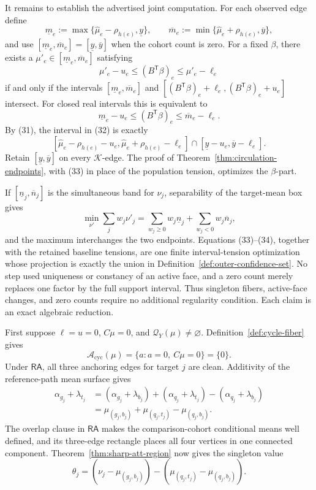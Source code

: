 It remains to establish the advertised joint computation.  For each observed edge define
\[
 \underline m_e:=\max\{\widehat\mu_e-\rho_{h(e)},\underline y\},
 \qquad
 \overline m_e:=\min\{\widehat\mu_e+\rho_{h(e)},\overline y\},
\tag{31}
\]
and use \([\underline m_e,\overline m_e]=[\underline y,\overline y]\) when the cohort count is zero.  For a fixed \(\beta\), there exists a \(\mu'_e\in[\underline m_e,\overline m_e]\) satisfying
\[
 \mu'_e-u_e\le(B^{\mathsf T}\beta)_e\le\mu'_e-\ell_e
\]
if and only if the intervals \([\underline m_e,\overline m_e]\) and \([(B^{\mathsf T}\beta)_e+\ell_e,(B^{\mathsf T}\beta)_e+u_e]\) intersect.  For closed real intervals this is equivalent to
\[
 \underline m_e-u_e\le(B^{\mathsf T}\beta)_e
 \le\overline m_e-\ell_e.
\tag{32}
\]
By (31), the interval in (32) is exactly
\[
 [\widehat\mu_e-\rho_{h(e)}-u_e,
   \widehat\mu_e+\rho_{h(e)}-\ell_e]
 \cap[\underline y-u_e,\overline y-\ell_e].
\tag{33}
\]
Retain \([\underline y,\overline y]\) on every \(\mathcal K\)-edge.  The proof of Theorem~\ref{thm:circulation-endpoints}, with (33) in place of the population tension, optimizes the \(\beta\)-part.

If \([\underline n_j,\overline n_j]\) is the simultaneous band for \(\nu_j\), separability of the target-mean box gives
\[
 \min_{\nu'}\sum_jw_j\nu'_j
 =\sum_{w_j\ge0}w_j\underline n_j
  +\sum_{w_j<0}w_j\overline n_j,
\tag{34}
\]
and the maximum interchanges the two endpoints.  Equations (33)--(34), together with the retained baseline tensions, are one finite interval-tension optimization whose projection is exactly the union in Definition~\ref{def:outer-confidence-set}.  No step used uniqueness or constancy of an active face, and a zero count merely replaces one factor by the full support interval.  Thus singleton fibers, active-face changes, and zero counts require no additional regularity condition.
Each claim is an exact algebraic reduction.

First suppose \(\ell=u=0\), \(C\mu=0\), and \(\mathcal Q_Y(\mu)\ne\varnothing\).  Definition~\ref{def:cycle-fiber} gives
\[
 \mathcal A_{\mathrm{cyc}}(\mu)
 =\{a:a=0,\ C\mu=0\}=\{0\}.
\tag{35}
\]
Under \(\mathsf{RA}\), all three anchoring edges for target \(j\) are clean.  Additivity of the reference-path mean surface gives
\[
 \begin{aligned}
 \alpha_{g_j}+\lambda_{t_j}
 &=(\alpha_{g_j}+\lambda_{b_j})
   +(\alpha_{q_j}+\lambda_{t_j})
   -(\alpha_{q_j}+\lambda_{b_j})\\
 &=\mu_{(g_j,b_j)}+\mu_{(q_j,t_j)}-\mu_{(q_j,b_j)}.
 \end{aligned}
\tag{36}
\]
The overlap clause in \(\mathsf{RA}\) makes the comparison-cohort conditional means well defined, and its three-edge rectangle places all four vertices in one connected component.  Theorem~\ref{thm:sharp-att-region} now gives the singleton value
\[
 \theta_j=(\nu_j-\mu_{(g_j,b_j)})
 -(\mu_{(q_j,t_j)}-\mu_{(q_j,b_j)}).
\tag{37}
\]

